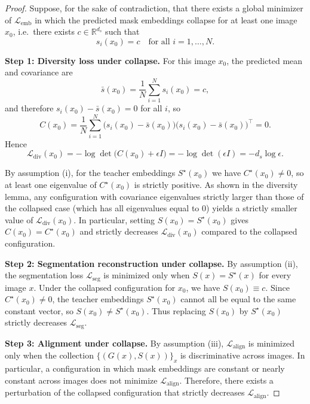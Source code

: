 \documentclass[12pt]{article}
\begin{document}
\begin{proof}
Suppose, for the sake of contradiction, that there exists a global minimizer
of $\mathcal{L}_{\mathrm{emb}}$ in which the predicted mask embeddings
collapse for at least one image $x_0$, i.e.\ there exists $c \in \mathbb{R}^{d_s}$
such that
\[
s_i(x_0) = c \quad \text{for all } i=1,\dots,N.
\]

\medskip
\noindent\textbf{Step 1: Diversity loss under collapse.}
For this image $x_0$, the predicted mean and covariance are
\[
\bar{s}(x_0) = \frac{1}{N} \sum_{i=1}^N s_i(x_0) = c,
\]
and therefore $s_i(x_0) - \bar{s}(x_0) = 0$ for all $i$, so
\[
C(x_0)
= \frac{1}{N} \sum_{i=1}^N
\big(s_i(x_0) - \bar{s}(x_0)\big)\big(s_i(x_0) - \bar{s}(x_0)\big)^\top
= 0.
\]
Hence
\[
\mathcal{L}_{\mathrm{div}}(x_0)
= - \log \det\big(C(x_0) + \epsilon I\big)
= - \log \det(\epsilon I)
= - d_s \log \epsilon.
\]

By assumption (i), for the teacher embeddings $S^\star(x_0)$ we have
$C^\star(x_0) \neq 0$, so at least one eigenvalue of $C^\star(x_0)$
is strictly positive.
As shown in the diversity lemma, any configuration with covariance
eigenvalues strictly larger than those of the collapsed case (which has
all eigenvalues equal to $0$) yields a strictly smaller value of
$\mathcal{L}_{\mathrm{div}}(x_0)$.
In particular, setting $S(x_0) = S^\star(x_0)$ gives $C(x_0)=C^\star(x_0)$
and strictly decreases $\mathcal{L}_{\mathrm{div}}(x_0)$ compared to the
collapsed configuration.

\medskip
\noindent\textbf{Step 2: Segmentation reconstruction under collapse.}
By assumption (ii), the segmentation loss $\mathcal{L}_{\mathrm{seg}}$
is minimized only when $S(x) = S^\star(x)$ for every image $x$.
Under the collapsed configuration for $x_0$, we have $S(x_0)\equiv c$.
Since $C^\star(x_0) \neq 0$, the teacher embeddings $S^\star(x_0)$
cannot all be equal to the same constant vector, so $S(x_0) \neq S^\star(x_0)$.
Thus replacing $S(x_0)$ by $S^\star(x_0)$ strictly decreases
$\mathcal{L}_{\mathrm{seg}}$.

\medskip
\noindent\textbf{Step 3: Alignment under collapse.}
By assumption (iii), $\mathcal{L}_{\mathrm{align}}$ is minimized only when
the collection $\{(G(x), S(x))\}_x$ is discriminative across images.
In particular, a configuration in which mask embeddings are constant
or nearly constant across images does not minimize $\mathcal{L}_{\mathrm{align}}$.
Therefore, there exists a perturbation of the collapsed configuration
that strictly decreases $\mathcal{L}_{\mathrm{align}}$.


\end{proof}
\end{document}

